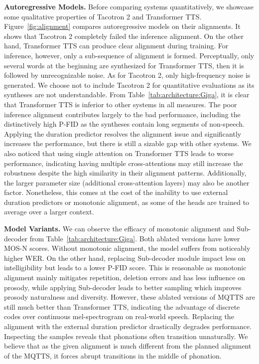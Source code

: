 \documentclass[letterpaper]{article}
\begin{document}
\textbf{Autoregressive Models.}
Before comparing systems quantitatively, we showcase some qualitative properties of Tacotron 2 and Transformer TTS.
Figure~\ref{fig:alignment} compares autoregressive models on their alignments.
It shows that Tacotron 2 completely failed the inference alignment.
On the other hand, Transformer TTS can produce clear alignment during training.
For inference, however, only a sub-sequence of alignment is formed.
Perceptually, only several words at the beginning are synthesized for Transformer TTS, then it is followed by unrecognizable noise.
As for Tacotron 2, only high-frequency noise is generated.
We choose not to include Tacotron 2 for quantitative evaluations as its syntheses are not understandable.
From Table~\ref{tab:architecture:Giga}, it is clear that Transformer TTS is inferior to other systems in all measures.
The poor inference alignment contributes largely to the bad performance, including the distinctively high P-FID as the syntheses contain long segments of non-speech.
Applying the duration predictor resolves the alignment issue and significantly increases the performance, but there is still a sizable gap with other systems.
We also noticed that using single attention on Transformer TTS leads to worse performance, indicating having multiple cross-attentions may still increase the robustness despite the high similarity in their alignment patterns.
Additionally, the larger parameter size (additional cross-attention layers) may also be another factor.
Nonetheless, this comes at the cost of the inability to use external duration predictors or monotonic alignment, as some of the heads are trained to average over a larger context.

\textbf{Model Variants.}
We can observe the efficacy of monotonic alignment and Sub-decoder from Table~\ref{tab:architecture:Giga}.
Both ablated versions have lower MOS-N scores.
Without monotonic alignment, the model suffers from noticeably higher WER.
On the other hand, replacing Sub-decoder module impact less on intelligibility but leads to a lower P-FID score.
This is reasonable as monotonic alignment mainly mitigates repetition, deletion errors and has less influence on prosody, while applying Sub-decoder leads to better sampling which improves prosody naturalness and diversity.
However, these ablated versions of MQTTS are still much better than Transformer TTS, indicating the advantage of discrete codes over continuous mel-spectrogram on real-world speech.
Replacing the alignment with the external duration predictor drastically degrades performance.
Inspecting the samples reveals that phonations often transition unnaturally.
We believe that as the given alignment is much different from the planned alignment of the MQTTS, it forces abrupt transitions in the middle of phonation.
\end{document}
